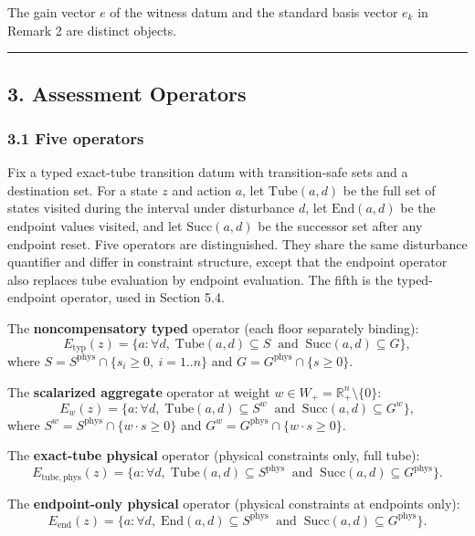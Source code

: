 \documentclass[11pt]{article}
\begin{document}
The gain vector \(e\) of the witness datum and the standard basis vector \(e_k\) in Remark 2 are distinct objects.

\begin{center}\rule{0.5\linewidth}{0.5pt}\end{center}

\subsection{3. Assessment Operators}\label{assessment-operators}

\subsubsection{3.1 Five operators}\label{five-operators}

Fix a typed exact-tube transition datum with transition-safe sets and a
destination set. For a state \(z\) and action \(a\), let
\(\mathrm{Tube}(a,d)\) be the full set of states visited during the
interval under disturbance \(d\), let \(\mathrm{End}(a,d)\) be the
endpoint values visited, and let \(\mathrm{Succ}(a,d)\) be the successor
set after any endpoint reset. Five operators are distinguished. They share the same disturbance quantifier and differ in constraint structure, except that the endpoint operator also replaces tube evaluation by endpoint evaluation. The fifth is the typed-endpoint operator, used in Section 5.4.

The \textbf{noncompensatory typed} operator (each floor separately
binding):
\[E_{\mathrm{typ}}(z) = \{ a : \forall d,\; \mathrm{Tube}(a,d) \subseteq S \ \text{ and } \ \mathrm{Succ}(a,d) \subseteq G \},\]
where \(S = S^{\mathrm{phys}} \cap \{ s_i \ge 0,\ i = 1..n \}\) and
\(G = G^{\mathrm{phys}} \cap \{ s \ge 0 \}\).

The \textbf{scalarized aggregate} operator at weight
\(w \in W_+ = \mathbb{R}^n_+ \setminus \{0\}\):
\[E_w(z) = \{ a : \forall d,\; \mathrm{Tube}(a,d) \subseteq S^w \ \text{ and } \ \mathrm{Succ}(a,d) \subseteq G^w \},\]
where \(S^w = S^{\mathrm{phys}} \cap \{ w \cdot s \ge 0 \}\) and
\(G^w = G^{\mathrm{phys}} \cap \{ w \cdot s \ge 0 \}\).

The \textbf{exact-tube physical} operator (physical constraints only,
full tube):
\[E_{\mathrm{tube,phys}}(z) = \{ a : \forall d,\; \mathrm{Tube}(a,d) \subseteq S^{\mathrm{phys}} \ \text{ and } \ \mathrm{Succ}(a,d) \subseteq G^{\mathrm{phys}} \}.\]

The \textbf{endpoint-only physical} operator (physical constraints at
endpoints only):
\[E_{\mathrm{end}}(z) = \{ a : \forall d,\; \mathrm{End}(a,d) \subseteq S^{\mathrm{phys}} \ \text{ and } \ \mathrm{Succ}(a,d) \subseteq G^{\mathrm{phys}} \}.\]
\end{document}
